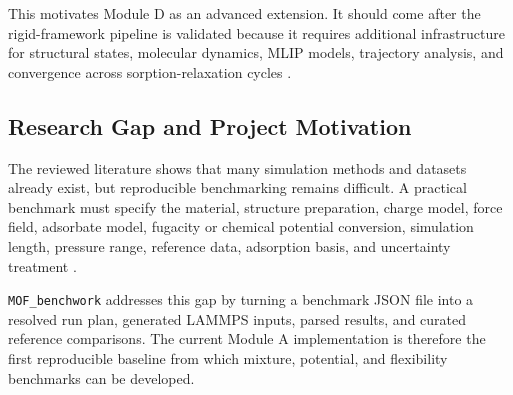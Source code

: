 This motivates Module D as an advanced extension.
It should come after the rigid-framework pipeline is validated because it requires additional infrastructure for structural states, molecular dynamics, MLIP models, trajectory analysis, and convergence across sorption-relaxation cycles \cite{wang2026flexible}.

\subsection{Research Gap and Project Motivation}

The reviewed literature shows that many simulation methods and datasets already exist, but reproducible benchmarking remains difficult.
A practical benchmark must specify the material, structure preparation, charge model, force field, adsorbate model, fugacity or chemical potential conversion, simulation length, pressure range, reference data, adsorption basis, and uncertainty treatment \cite{tao2022gcmc,mukherjee2023active,edwards2026mlipmc,wang2026flexible,crafted2023,nistadsorption}.

\texttt{MOF\_benchwork} addresses this gap by turning a benchmark JSON file into a resolved run plan, generated LAMMPS inputs, parsed results, and curated reference comparisons.
The current Module A implementation is therefore the first reproducible baseline from which mixture, potential, and flexibility benchmarks can be developed.
